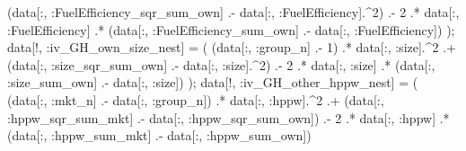 \documentclass[
  letterpaper,
  DIV=11,
  numbers=noendperiod]{scrreprt}
\newenvironment{Shaded}{\begin{snugshade}}{\end{snugshade}}
\newcommand{\FloatTok}[1]{\textcolor[rgb]{0.68,0.00,0.00}{#1}}
\newcommand{\NormalTok}[1]{\textcolor[rgb]{0.00,0.23,0.31}{#1}}
\newcommand{\OperatorTok}[1]{\textcolor[rgb]{0.37,0.37,0.37}{#1}}
\begin{document}
\begin{Shaded}
\begin{Highlighting}[]
\NormalTok{    (data[}\OperatorTok{:}\NormalTok{, }\OperatorTok{:}\NormalTok{FuelEfficiency\_sqr\_sum\_own] }\OperatorTok{.{-}}\NormalTok{ data[}\OperatorTok{:}\NormalTok{, }\OperatorTok{:}\NormalTok{FuelEfficiency]}\OperatorTok{.\^{}}\FloatTok{2}\NormalTok{) }\OperatorTok{.{-}} 
    \FloatTok{2} \OperatorTok{.*}\NormalTok{ data[}\OperatorTok{:}\NormalTok{, }\OperatorTok{:}\NormalTok{FuelEfficiency] }\OperatorTok{.*}\NormalTok{ (data[}\OperatorTok{:}\NormalTok{, }\OperatorTok{:}\NormalTok{FuelEfficiency\_sum\_own] }\OperatorTok{.{-}}\NormalTok{ data[}\OperatorTok{:}\NormalTok{, }\OperatorTok{:}\NormalTok{FuelEfficiency])}
\NormalTok{);}
\NormalTok{data[!, }\OperatorTok{:}\NormalTok{iv\_GH\_own\_size\_nest]             }\OperatorTok{=}\NormalTok{ (}
\NormalTok{    (data[}\OperatorTok{:}\NormalTok{, }\OperatorTok{:}\NormalTok{group\_n] }\OperatorTok{.{-}} \FloatTok{1}\NormalTok{) }\OperatorTok{.*}\NormalTok{ data[}\OperatorTok{:}\NormalTok{, }\OperatorTok{:}\NormalTok{size]}\OperatorTok{.\^{}}\FloatTok{2} \OperatorTok{.+} 
\NormalTok{    (data[}\OperatorTok{:}\NormalTok{, }\OperatorTok{:}\NormalTok{size\_sqr\_sum\_own] }\OperatorTok{.{-}}\NormalTok{ data[}\OperatorTok{:}\NormalTok{, }\OperatorTok{:}\NormalTok{size]}\OperatorTok{.\^{}}\FloatTok{2}\NormalTok{) }\OperatorTok{.{-}} 
    \FloatTok{2} \OperatorTok{.*}\NormalTok{ data[}\OperatorTok{:}\NormalTok{, }\OperatorTok{:}\NormalTok{size] }\OperatorTok{.*}\NormalTok{ (data[}\OperatorTok{:}\NormalTok{, }\OperatorTok{:}\NormalTok{size\_sum\_own] }\OperatorTok{.{-}}\NormalTok{ data[}\OperatorTok{:}\NormalTok{, }\OperatorTok{:}\NormalTok{size])}
\NormalTok{);}
\NormalTok{data[!, }\OperatorTok{:}\NormalTok{iv\_GH\_other\_hppw\_nest]           }\OperatorTok{=}\NormalTok{ (}
\NormalTok{    (data[}\OperatorTok{:}\NormalTok{, }\OperatorTok{:}\NormalTok{mkt\_n] }\OperatorTok{.{-}}\NormalTok{ data[}\OperatorTok{:}\NormalTok{, }\OperatorTok{:}\NormalTok{group\_n]) }\OperatorTok{.*}\NormalTok{ data[}\OperatorTok{:}\NormalTok{, }\OperatorTok{:}\NormalTok{hppw]}\OperatorTok{.\^{}}\FloatTok{2} \OperatorTok{.+} 
\NormalTok{    (data[}\OperatorTok{:}\NormalTok{, }\OperatorTok{:}\NormalTok{hppw\_sqr\_sum\_mkt] }\OperatorTok{.{-}}\NormalTok{ data[}\OperatorTok{:}\NormalTok{, }\OperatorTok{:}\NormalTok{hppw\_sqr\_sum\_own]) }\OperatorTok{.{-}} 
    \FloatTok{2} \OperatorTok{.*}\NormalTok{ data[}\OperatorTok{:}\NormalTok{, }\OperatorTok{:}\NormalTok{hppw] }\OperatorTok{.*}\NormalTok{ (data[}\OperatorTok{:}\NormalTok{, }\OperatorTok{:}\NormalTok{hppw\_sum\_mkt] }\OperatorTok{.{-}}\NormalTok{ data[}\OperatorTok{:}\NormalTok{, }\OperatorTok{:}\NormalTok{hppw\_sum\_own])}

\end{Highlighting}
\end{Shaded}
\end{document}
